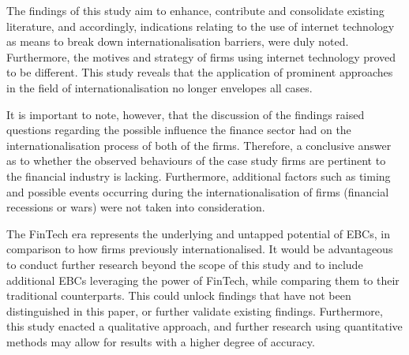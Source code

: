 \documentclass[11pt,a4paper]{article}
\begin{document}
{{{ \par
The findings of this study aim to enhance, contribute and consolidate existing literature, and accordingly, indications relating to the use of internet technology as means to break down internationalisation barriers, were duly noted. Furthermore, the motives and strategy of firms using internet technology proved to be different. This study reveals that the application of prominent approaches in the field of internationalisation no longer envelopes all cases. \par
It is important to note, however, that the discussion of the findings raised questions regarding the possible influence the finance sector had on the internationalisation process of both of the firms. Therefore, a conclusive answer as to whether the observed behaviours of the case study firms are pertinent to the financial industry is lacking. Furthermore, additional factors such as timing and possible events occurring during the internationalisation of firms (financial recessions or wars) were not taken into consideration. \par
The FinTech era represents the underlying and untapped potential of EBCs, in comparison to how firms previously internationalised. It would be advantageous to conduct further research beyond the scope of this study and to include additional EBCs leveraging the power of FinTech, while comparing them to their traditional counterparts. This could unlock findings that have not been distinguished in this paper, or further validate existing findings. Furthermore, this study enacted a qualitative approach, and further research using quantitative methods may allow for results with a higher degree of accuracy.





\newpage


}}}
\end{document}
